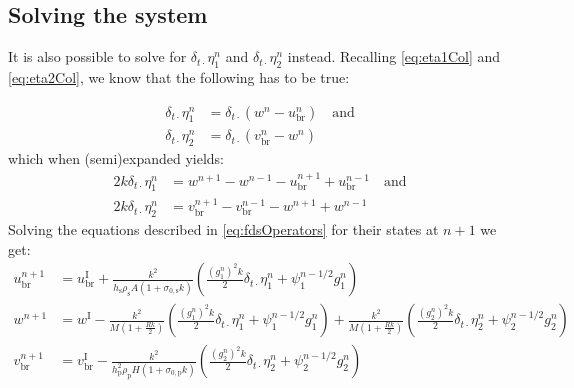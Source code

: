 \subsection{Solving the system}
It is also possible to solve for  $\delta_{t\cdot}\eta_1^n$ and $\delta_{t\cdot}\eta_2^n$ instead. Recalling \eqref{eq:eta1Col} and \eqref{eq:eta2Col}, we know that the following has to be true:

\begin{equation}
\begin{aligned}
    \delta_{t\cdot}\eta_1^n &= \delta_{t\cdot}(w^n - u_\text{br}^n) \quad \text{and}\\
    \delta_{t\cdot}\eta_2^n &= \delta_{t\cdot}(v_\text{br}^n - w^n)
    \end{aligned}
\end{equation}
which when (semi)expanded yields:
\begin{equation}\label{eq:expandedEtas}
\begin{aligned}
    2k\delta_{t\cdot}\eta_1^n &= w^{n+1}-w^{n-1}-u_\text{br}^{n+1}+u_\text{br}^{n-1} \quad \text{and}\\  2k\delta_{t\cdot}\eta_2^n &= v_\text{br}^{n+1}-v_\text{br}^{n-1}-w^{n+1}+w^{n-1}
    \end{aligned}
\end{equation}
Solving the equations described in \eqref{eq:fdsOperators} for their states at $n+1$ we get:
\begin{subequations}
\begin{align}
    u_\text{br}^{n+1} &= u_\text{br}^\text{I}
     +\frac{k^2}{h_\text{s}\rho_\text{s}A(1+\sigma_{0,\text{s}}k)}\left(\frac{(g_1^n)^2k}{2}\delta_{t\cdot}\eta_1^n+\psi_1^{n-1/2}g_1^n\right)\nonumber\\
    w^{n+1} &= w^\text{I}-\frac{k^2}{M\left(1+\frac{Rk}{2}\right)}\left(\frac{(g_1^n)^2k}{2}\delta_{t\cdot}\eta_1^n+\psi_1^{n-1/2}g_1^n\right)+\frac{k^2}{M\left(1+\frac{Rk}{2}\right)}\left(\frac{(g_2^n)^2k}{2}\delta_{t\cdot}\eta_2^n+\psi_2^{n-1/2}g_2^n\right)\nonumber\\
    v_\text{br}^{n+1} &= v_\text{br}^\text{I}-\frac{k^2}{h_\text{p}^2\rho_\text{p}H(1+\sigma_{0,\text{p}}k)}\left(\frac{(g_2^n)^2k}{2}\delta_{t\cdot}\eta_2^n+\psi_2^{n-1/2}g_2^n\right)\nonumber
\end{align}
\end{subequations}
